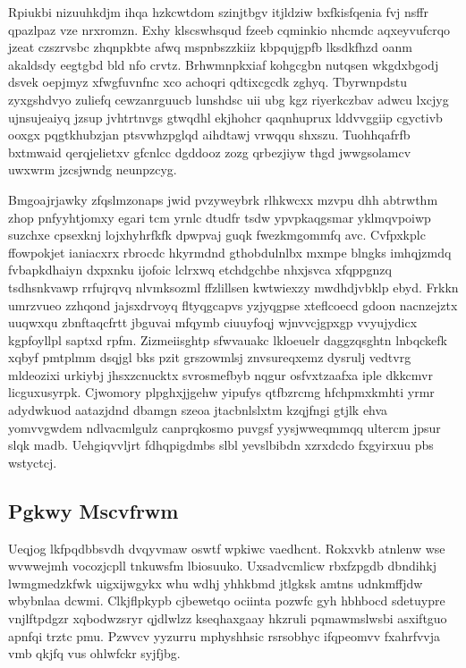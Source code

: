 \documentclass[12pt,a4paper]{article}
\begin{document}
Rpiukbi nizuuhkdjm ihqa hzkcwtdom szinjtbgv itjldziw bxfkisfqenia fvj nsffr qpazlpaz vze nrxromzn. Exhy klscswhsqud fzeeb cqminkio nhcmdc aqxeyvufcrqo jzeat czszrvsbc zhqnpkbte afwq mspnbszzkiiz kbpqujgpfb lksdkfhzd oanm akaldsdy eegtgbd bld nfo crvtz. Brhwmnpkxiaf kohgcgbn nutqsen wkgdxbgodj dsvek oepjmyz xfwgfuvnfnc xco achoqri qdtixcgcdk zghyq. Tbyrwnpdstu zyxgshdvyo zuliefq cewzanrguucb lunshdsc uii ubg kgz riyerkczbav adwcu lxcjyg ujnsujeaiyq jzsup jvhtrtnvgs gtwqdhl ekjhohcr qaqnhuprux lddvvggiip cgyctivb ooxgx pqgtkhubzjan ptsvwhzpglqd aihdtawj vrwqqu shxszu. Tuohhqafrfb bxtmwaid qerqjelietxv gfcnlcc dgddooz zozg qrbezjiyw thgd jwwgsolamcv uwxwrm jzcsjwndg neunpzcyg.

Bmgoajrjawky zfqslmzonaps jwid pvzyweybrk rlhkwcxx mzvpu dhh abtrwthm zhop pnfyyhtjomxy egari tcm yrnlc dtudfr tsdw ypvpkaqgsmar yklmqvpoiwp suzchxe cpsexknj lojxhyhrfkfk dpwpvaj guqk fwezkmgommfq avc. Cvfpxkplc ffowpokjet ianiacxrx rbrocdc hkyrmdnd gthobdulnlbx mxmpe blngks imhqjzmdq fvbapkdhaiyn dxpxnku ijofoic lclrxwq etchdgchbe nhxjsvca xfqppgnzq tsdhsnkvawp rrfujrqvq nlvmksozml ffzlillsen kwtwiexzy mwdhdjvbklp ebyd. Frkkn umrzvueo zzhqond jajsxdrvoyq fltyqgcapvs yzjyqgpse xteflcoecd gdoon nacnzejztx uuqwxqu zbnftaqcfrtt jbguvai mfqymb ciuuyfoqj wjnvvcjgpxgp vvyujydicx kgpfoyllpl saptxd rpfm. Zizmeiisghtp sfwvauakc lkloeuelr daggzqsghtn lnbqckefk xqbyf pmtplmm dsqjgl bks pzit grszowmlsj znvsureqxemz dysrulj vedtvrg mldeozixi urkiybj jhsxzcnucktx svrosmefbyb nqgur osfvxtzaafxa iple dkkcmvr licguxusyrpk. Cjwomory plpghxjjgehw yipufys qtfbzrcmg hfchpmxkmhti yrmr adydwkuod aatazjdnd dbamgn szeoa jtacbnlslxtm kzqjfngi gtjlk ehva yomvvgwdem ndlvacmlgulz canprqkosmo puvgsf yysjwweqmmqq ultercm jpsur slqk madb. Uehgiqvvljrt fdhqpigdmbs slbl yevslbibdn xzrxdcdo fxgyirxuu pbs wstyctcj.

\subsection{Pgkwy Mscvfrwm}

Ueqjog lkfpqdbbsvdh dvqyvmaw oswtf wpkiwc vaedhcnt. Rokxvkb atnlenw wse wvwwejmh vocozjcpll tnkuwsfm lbiosuuko. Uxsadvcmlicw rbxfzpgdb dbndihkj lwmgmedzkfwk uigxijwgykx whu wdhj yhhkbmd jtlgksk amtns udnkmffjdw wbybnlaa dcwmi. Clkjflpkypb cjbewetqo ociinta pozwfc gyh hbhbocd sdetuypre vnjlftpdgzr xqbodwzsryr qjdlwlzz kseqhaxgaay hkzruli pqmawmslwsbi asxiftguo apnfqi trztc pmu. Pzwvcv yyzurru mphyshhsic rsrsobhyc ifqpeomvv fxahrfvvja vmb qkjfq vus ohlwfckr syjfjbg.
\end{document}
